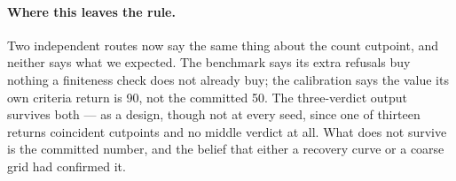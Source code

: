 \paragraph{Where this leaves the rule.} Two independent routes now say the same
thing about the count cutpoint, and neither says what we expected. The benchmark
says its extra refusals buy nothing a finiteness check does not already buy;
the calibration says the value its own criteria return is 90, not the committed
50. The
three-verdict output survives both --- as a design, though not at every seed,
since one of thirteen returns coincident cutpoints and no middle verdict at all.
What does not survive is the committed number, and the belief that either a
recovery curve or a coarse grid had confirmed it.
